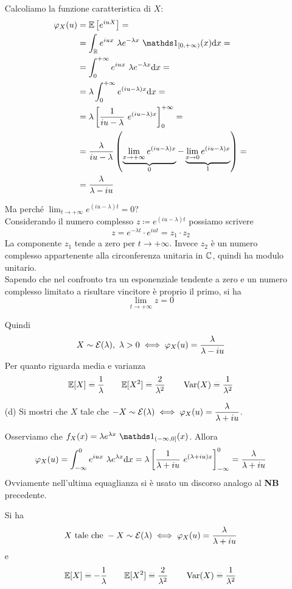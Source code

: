 \begin{enumerate}
Calcoliamo la funzione caratteristica di $X$:
\begin{gather*}
\begin{aligned}
\varphi_X(u)&=\EE\left[e^{iuX}  \right]=\\
&=\int_\RR e^{iux}\ \lambda e^{-\lambda x}\ \Ind_{[0,+\infty)}(x)\dx=\\
&=\int_0^{+\infty}e^{iux}\ \lambda e^{-\lambda x}\dx=\\
&=\lambda\int_0^{+\infty}e^{(iu-\lambda)x}\dx=\\
&=\lambda\left[\frac{1}{iu-\lambda}\ e^{(iu-\lambda)x}   \right]_0^{+\infty}=\\
&=\displaystyle\frac{\lambda}{iu-\lambda}\left(\underbrace{\lim_{x\to+\infty}e^{(iu-\lambda)x}}_{0}-\underbrace{\lim_{x\to 0}e^{(iu-\lambda)x}}_{1}   \right)=\\
&=\frac{\lambda}{\lambda-iu}
\end{aligned}
\end{gather*}
\begin{nb}
Ma perché $\displaystyle\lim_{t\to+\infty}e^{(iu-\lambda)t}=0$? \\
Considerando il numero complesso $z\coloneqq e^{(iu-\lambda)t}$ possiamo scrivere
\[
z=e^{-\lambda t}\cdot e^{iut}=z_1\cdot z_2
\]
La componente $z_1$ tende a zero per $t\to+\infty$. Invece $z_2$ è un numero complesso appartenente alla circonferenza unitaria in $\mathbb{C}$, quindi ha modulo unitario. \\
Sapendo che nel confronto tra un esponenziale tendente a zero e un numero complesso limitato a risultare vincitore è proprio il primo, si ha
\[
\displaystyle\lim_{t\to+\infty}z=0
\]
\end{nb}
Quindi
\[
X\sim\Ec(\lambda),\ \lambda>0\iff\varphi_X(u)=\frac{\lambda}{\lambda-iu}
\]
Per quanto riguarda media e varianza
\[
\mathbb{E}[X]\overset{\underset{\dots}{}}{=}\frac{1}{\lambda} \qquad \mathbb{E}[X^2]\overset{\underset{\dots}{}}{=}\frac{2}{\lambda^2}\qquad \operatorname{Var}(X)\overset{\underset{\dots}{}}{=}\frac{1}{\lambda^2}
\]

\item [(d)] Si mostri che $X$ tale che $-X\sim\mathcal{E}(\lambda)\iff\varphi_X(u)=\dfrac{\lambda}{\lambda+iu}$.

Osserviamo che $f_X(x)=\lambda e^{\lambda x}\ \Ind_{(-\infty,0]}(x)$. Allora
\[
\varphi_X(u)=\int_{-\infty}^0e^{iux}\ \lambda e^{\lambda x}\dx=\lambda\left[\frac{1}{\lambda+iu}\ e^{(\lambda+iu)x}   \right]_{-\infty}^{0}=\frac{\lambda}{\lambda+iu}
\]
Ovviamente nell'ultima equaglianza si è usato un discorso analogo al \textbf{NB} precedente.

Si ha
\[
X\text{ tale che }-X\sim\mathcal{E}(\lambda)\iff\varphi_X(u)=\dfrac{\lambda}{\lambda+iu}
\]
e
\[
\mathbb{E}[X]\overset{\underset{\dots}{}}{=}-\frac{1}{\lambda} \qquad \mathbb{E}[X^2]\overset{\underset{\dots}{}}{=}\frac{2}{\lambda^2}\qquad \operatorname{Var}(X)\overset{\underset{\dots}{}}{=}\frac{1}{\lambda^2}
\]
\end{enumerate}

